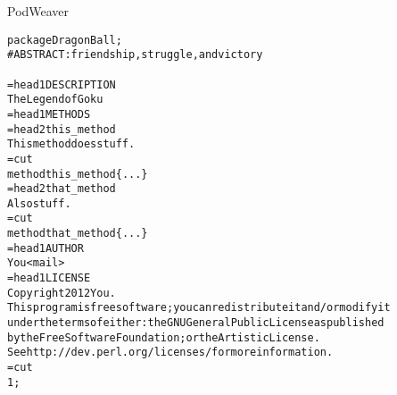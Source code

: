 \documentclass[serif,14pt,color=usenames,dvipsnames]{beamer}
\begin{document}
\begin{frame}{PodWeaver}        %
\begin{alltt}
\tiny
package DragonBall;\\
\# ABSTRACT: friendship, struggle, and victory\\
~\\
=head1 DESCRIPTION\\
The Legend of Goku\\
=head1 METHODS\\
=head2 this\_method\\
This method does stuff.\\
=cut\\
method this\_method \{ ... \}\\
=head2 that\_method\\
Also stuff.\\
=cut\\
method that\_method \{ ... \}\\
=head1 AUTHOR\\
You <mail>\\
=head1 LICENSE\\
Copyright 2012 You.\\
This program is free software; you can redistribute it and/or modify it
under the terms of either: the GNU General Public License as published
by the Free Software Foundation; or the Artistic License.\\
See http://dev.perl.org/licenses/ for more information.\\
=cut\\
1;\\
\end{alltt}
\end{frame}
\end{document}
